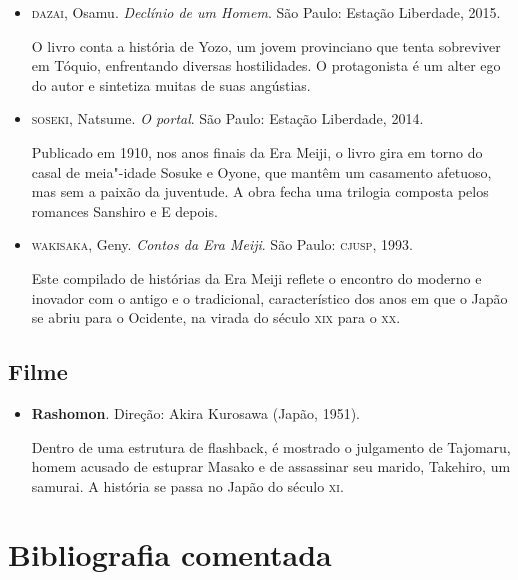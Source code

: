 \documentclass[12pt]{extarticle}
\begin{document}
\begin{itemize}
\item\textsc{dazai}, Osamu. \textit{Declínio de um Homem}. São Paulo: Estação
Liberdade, 2015.

O livro conta a história de Yozo, um jovem provinciano que tenta
sobreviver em Tóquio, enfrentando diversas hostilidades. O protagonista
é um alter ego do autor e sintetiza muitas de suas angústias.

\item\textsc{soseki}, Natsume. \textit{O portal}. São Paulo: Estação Liberdade, 2014.

Publicado em 1910, nos anos finais da Era Meiji, o livro gira em torno
do casal de meia"-idade Sosuke e Oyone, que mantêm um casamento afetuoso,
mas sem a paixão da juventude. A obra fecha uma trilogia composta pelos
romances Sanshiro e E depois.

\item\textsc{wakisaka}, Geny. \textit{Contos da Era Meiji}. São Paulo: \textsc{cjusp}, 1993.

Este compilado de histórias da Era Meiji reflete o encontro do moderno e
inovador com o antigo e o tradicional, característico dos anos em que o
Japão se abriu para o Ocidente, na virada do século \textsc{xix} para o \textsc{xx}.
\end{itemize}

\subsection{Filme}

\begin{itemize}
\item\textbf{Rashomon}. Direção: Akira Kurosawa (Japão, 1951).

Dentro de uma estrutura de flashback, é mostrado o julgamento de
Tajomaru, homem acusado de estuprar Masako e de assassinar seu marido,
Takehiro, um samurai. A história se passa no Japão do século \textsc{xi}.
\end{itemize}

\section{Bibliografia comentada}
\end{document}
